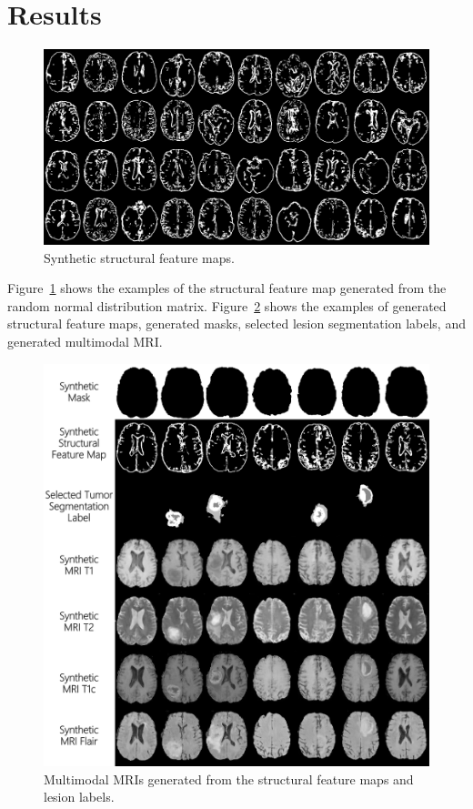 \documentclass[letterpaper]{article} %
\begin{document}
\section{Results}
\begin{figure}
	\centering
	\includegraphics[width=0.65\linewidth]{figures/Fs}
	\caption{Synthetic structural feature maps.}
	\label{generated_f}
\end{figure}
Figure~\ref{generated_f} shows the examples of the structural feature map generated from the random normal distribution matrix. Figure~\ref{generated_mri} shows the examples of generated structural feature maps, generated masks, selected lesion segmentation labels, and generated multimodal MRI.
\begin{figure}
	\centering
	\includegraphics[width=0.65\linewidth]{figures/F_to_MRI}
	\caption{Multimodal MRIs generated from the structural feature maps and lesion labels.}
	\label{generated_mri}
\end{figure}
\end{document}
